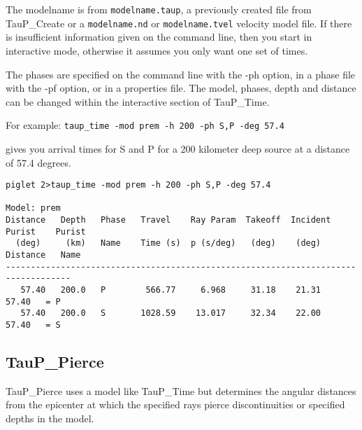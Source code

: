 The modelname is from \texttt{modelname.taup}, a previously created file 
from TauP\_Create or a \texttt{modelname.nd} or \texttt{modelname.tvel} velocity model file. 
If there is insufficient information given on the command line, then you start
in interactive mode, otherwise it assumes you only want one set of times.

The phases are specified on the command line with the -ph option,
in a phase file with the -pf option, or in a properties file.
The model, phases, depth and distance can be changed within the interactive
section of TauP\_Time.

For example: \texttt{taup\_time -mod prem -h 200 -ph S,P -deg 57.4}

gives you arrival times for S and P for a 200 kilometer
deep source at a distance of 57.4 degrees.
\begin{verbatim}
piglet 2>taup_time -mod prem -h 200 -ph S,P -deg 57.4

Model: prem
Distance   Depth   Phase   Travel    Ray Param  Takeoff  Incident  Purist    Purist
  (deg)     (km)   Name    Time (s)  p (s/deg)   (deg)    (deg)   Distance   Name 
-----------------------------------------------------------------------------------
   57.40   200.0   P        566.77     6.968     31.18    21.31    57.40   = P    
   57.40   200.0   S       1028.59    13.017     32.34    22.00    57.40   = S    
\end{verbatim}

\subsection{TauP\_Pierce}

TauP\_Pierce uses a model like TauP\_Time but
determines the
angular distances from the epicenter at which the specified rays pierce 
discontinuities or specified depths in the model.

